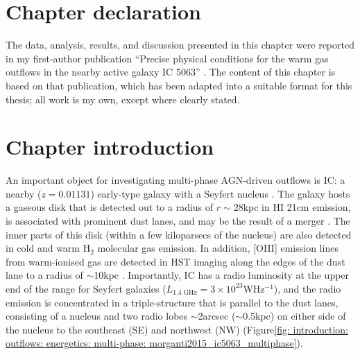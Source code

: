 \section*{Chapter declaration}
The data, analysis, results, and discussion presented in this chapter were reported in my first-author publication ``Precise physical conditions for the warm gas outflows in the nearby active galaxy IC 5063'' \citep{Holden2023}. The content of this chapter is based on that publication, which has been adapted into a suitable format for this thesis; all work is my own, except where clearly stated.

\newpage

\section{Chapter introduction}
\label{section: xshooter_ic5063: introduction}


An important object for investigating multi-phase AGN-driven outflows is IC: a nearby ($z=0.01131$) early-type galaxy with a Seyfert nucleus \citep{Danziger1981, Inglis1993}. The galaxy hosts a gaseous disk that is detected out to a radius of $r\sim28$\;kpc in HI 21\;cm emission, is associated with prominent dust lanes, and may be the result of a merger \citep{Morganti1998}. The inner parts of this disk (within a few kiloparsecs of the nucleus) are also detected in cold \citep{Morganti2015} and warm H$_2$ \citep{Tadhunter2014} molecular gas emission. In addition, [OIII] emission lines from warm-ionised gas are detected in HST imaging along the edges of the dust lane to a radius of $\sim$10\;kpc \citep{Morganti1998}.  Importantly, IC has a radio luminosity at the upper end of the range for Seyfert galaxies ($L_\mathrm{1.4\;GHz}=3\times10^{23}$\;W\;Hz$^{-1}$), and the radio emission is concentrated in a triple-structure that is parallel to the dust lanes, consisting of a nucleus and two radio lobes $\sim$2\;arcsec ($\sim$0.5\;kpc) on either side of the nucleus to the southeast (SE) and northwest (NW) (Figure\;\ref{fig: introduction: outflows: energetics: multi-phase: morganti2015_ic5063_multiphase}). 

